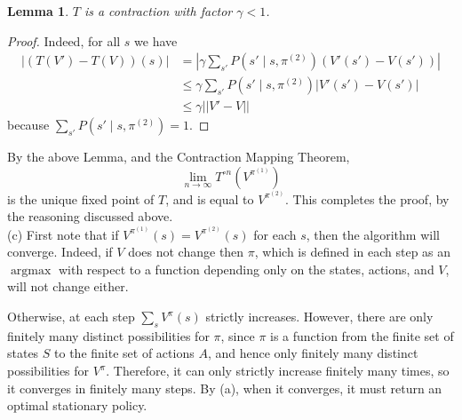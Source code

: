 \documentclass[12pt]{article}
\DeclareMathOperator{\argmax}{argmax}
\newtheorem{lemma}[thm]{Lemma}
\theoremstyle{remark}
\begin{document}
\begin{lemma}
$T$ is a contraction with factor $\gamma < 1$. 
\end{lemma}

\begin{proof}
Indeed, for all $s$ we have 
\begin{align*}
|(T(V')-T(V))(s)| & = |\gamma \sum_{s'} P(s' \mid s, \pi^{(2)}) (V'(s') - V(s'))| \\
&\leq \gamma \sum_{s'} P(s' \mid s, \pi^{(2)}) |V'(s')-V(s')| \\
&\leq \gamma ||V'-V||
\end{align*}
because $\sum_{s'} P(s' \mid s, \pi^{(2)}) = 1$. 
\end{proof}

By the above Lemma, and the Contraction Mapping Theorem, 
\[
\lim_{n \rightarrow \infty} T^{\circ n}(V^{\pi^{(1)}}) 
\]
is the unique fixed point of $T$, and is equal to $V^{\pi^{(2)}}$. This completes the proof, by the reasoning discussed above. \\ 

\noindent (c) First note that if $V^{\pi^{(1)}}(s) = V^{\pi^{(2)}}(s)$ for each $s$, then the algorithm will converge. Indeed, if $V$ does not change then $\pi$, which is defined in each step as an $\argmax$ with respect to a function depending only on the states, actions, and $V$, will not change either. 

Otherwise, at each step $\sum_s V^{\pi}(s)$ strictly increases. However, there are only finitely many distinct possibilities for $\pi$, since $\pi$ is a function from the finite set of states $S$ to the finite set of actions $A$, and hence only finitely many distinct possibilities for $V^{\pi}$. Therefore, it can only strictly increase finitely many times, so it converges in finitely many steps. By (a), when it converges, it must return an optimal stationary policy. 
\end{document}

